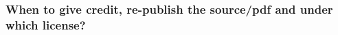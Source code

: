 	\newpage
	\subsubsection{When to give credit, re-publish the source/pdf and under which license?}
	\label{appendix:sec:licensing:examples-when-credit-or-re-publishing}
	\newcommand{\qAndATableRowEntry}[3]{
		\begin{minipage}[t]{0.0125\linewidth}
			\textbf{#1}
		\end{minipage} 
		& \begin{minipage}[t]{0.9\linewidth}
			#2
		\end{minipage}
	}

	\newcommand{\qAndAQUESTION}[1]{
		\qAndATableRowEntry{\textbf{Q:}}{#1}{0.125cm}
	}

	\newcommand{\qAndAANSWER}[1]{
		\qAndATableRowEntry{\textbf{A:}}{#1}{0.25cm}
	}
	
